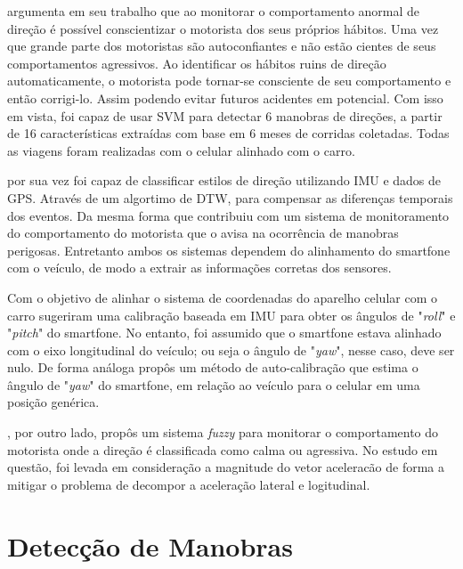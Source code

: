 \citeauthor{chen2015d} argumenta em seu trabalho que ao monitorar o comportamento anormal de direção é possível conscientizar o motorista dos seus próprios hábitos. Uma vez que grande parte dos motoristas são autoconfiantes e não estão cientes de seus comportamentos agressivos. Ao identificar os hábitos ruins de direção automaticamente, o motorista pode tornar-se consciente de seu comportamento e então corrigi-lo. Assim podendo evitar futuros acidentes em potencial. Com isso em vista, \citeauthor{chen2015d} foi capaz de usar SVM para detectar 6 manobras de direções, a partir de 16 características extraídas com base em 6 meses de corridas coletadas. Todas as viagens foram realizadas com o celular alinhado com o carro.

\citeauthor{eren2012estimating} por sua vez foi capaz de classificar estilos de direção utilizando IMU e dados de GPS. Através de um algortimo de DTW, para compensar as diferenças temporais dos eventos. Da mesma forma que \citeauthor{fazeen2012safe} contribuiu com um sistema de monitoramento do comportamento do motorista que o avisa na ocorrência de manobras perigosas. Entretanto ambos os sistemas dependem do alinhamento do smartfone com o veículo, de modo a extrair as informações corretas dos sensores.

Com o objetivo de alinhar o sistema de coordenadas do aparelho celular com o carro \citeauthor*{dai2010mobile}\citep{dai2010mobile} sugeriram uma calibração baseada em IMU para obter os ângulos de "\textit{roll}" e "\textit{pitch}" do smartfone. No entanto, foi assumido que o smartfone estava alinhado com o eixo longitudinal do veículo; ou seja o ângulo de "\textit{yaw}", nesse caso, deve ser nulo. De forma análoga \citeauthor{almazan2013full} propôs um método de auto-calibração que estima o ângulo de "\textit{yaw}" do smartfone, em relação ao veículo para o celular em uma posição genérica.

\citeauthor{castignani2015driver}, por outro lado, propôs um sistema \textit{fuzzy} para monitorar o comportamento do motorista onde a direção é classificada como calma ou agressiva. No estudo em questão, foi levada em consideração a magnitude do vetor aceleracão de forma a mitigar o problema de decompor a aceleração lateral e logitudinal.


 
\section{Detecção de Manobras}


